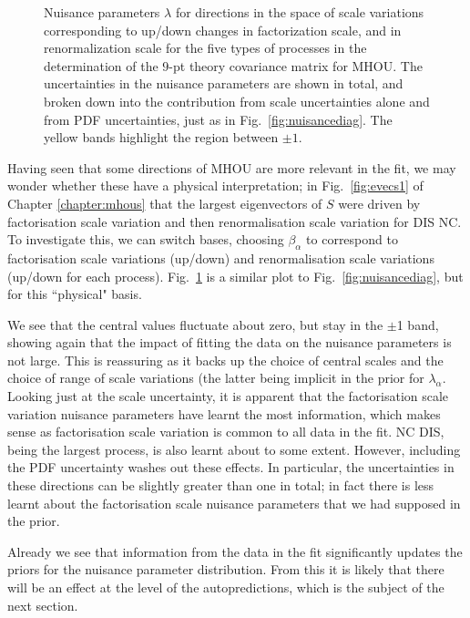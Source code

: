 \begin{figure}[H]
\begin{center}
    \end{center}
  \vspace{-0.55cm}
  \caption{Nuisance parameters $\lambda$ for directions in the space of scale variations corresponding to up/down changes in factorization scale, and in renormalization scale for the five types of processes in the determination of the $9$-pt theory covariance matrix for MHOU. The uncertainties in the nuisance parameters are shown in total, and broken down into the contribution from scale uncertainties alone and from PDF uncertainties, just as in Fig.~\ref{fig:nuisancediag}. The yellow bands highlight the region between $\pm 1$.}
  \label{fig:nuisancephys}
\end{figure}

Having seen that some directions of MHOU are more relevant in the fit, we may wonder whether these have a physical interpretation; in Fig.~\ref{fig:evecs1} of Chapter \ref{chapter:mhous} that the largest eigenvectors of $S$ were driven by factorisation scale variation and then renormalisation scale variation for DIS NC. To investigate this, we can switch bases, choosing $\beta_\alpha$ to correspond to factorisation scale variations (up/down) and renormalisation scale variations (up/down for each process). Fig.~\ref{fig:nuisancephys} is a similar plot to Fig.~\ref{fig:nuisancediag}, but for this ``physical" basis. 

We see that the central values fluctuate about zero, but stay in the $\pm$1 band, showing again that the impact of fitting the data on the nuisance parameters is not large. This is reassuring as it backs up the choice of central scales and the choice of range of scale variations (the latter being implicit in the prior for $\lambda_\alpha$. Looking just at the scale uncertainty, it is apparent that the factorisation scale variation nuisance parameters have learnt the most information, which makes sense as factorisation scale variation is common to all data in the fit. NC DIS, being the largest process, is also learnt about to some extent. However, including the PDF uncertainty washes out these effects. In particular, the uncertainties in these directions can be slightly greater than one in total; in fact there is less learnt about the factorisation scale nuisance parameters that we had supposed in the prior.

Already we see that information from the data in the fit significantly updates the priors for the nuisance parameter distribution. From this it is likely that there will be an effect at the level of the autopredictions, which is the subject of the next section.

